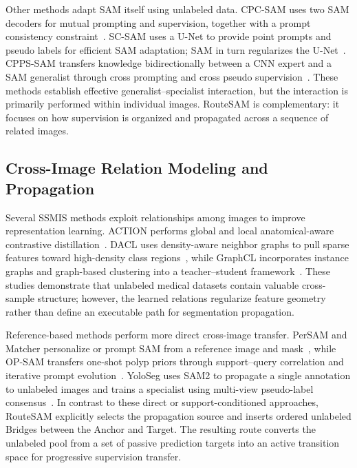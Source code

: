\documentclass[a4paper,fleqn]{cas-dc}
\begin{document}
Other methods adapt SAM itself using unlabeled data. CPC-SAM uses two SAM decoders for mutual prompting and supervision, together with a prompt consistency constraint~\cite{miao2024cpcsam}. SC-SAM uses a U-Net to provide point prompts and pseudo labels for efficient SAM adaptation; SAM in turn regularizes the U-Net~\cite{vu2026scsam}. CPPS-SAM transfers knowledge bidirectionally between a CNN expert and a SAM generalist through cross prompting and cross pseudo supervision~\cite{zhang2026cppssam}. These methods establish effective generalist--specialist interaction, but the interaction is primarily performed within individual images. RouteSAM is complementary: it focuses on how supervision is organized and propagated across a sequence of related images.

\subsection{Cross-Image Relation Modeling and Propagation}

Several SSMIS methods exploit relationships among images to improve representation learning. ACTION performs global and local anatomical-aware contrastive distillation~\cite{you2022action}. DACL uses density-aware neighbor graphs to pull sparse features toward high-density class regions~\cite{tang2024dacl}, while GraphCL incorporates instance graphs and graph-based clustering into a teacher--student framework~\cite{wang2024graphcl}. These studies demonstrate that unlabeled medical datasets contain valuable cross-sample structure; however, the learned relations regularize feature geometry rather than define an executable path for segmentation propagation.

Reference-based methods perform more direct cross-image transfer. PerSAM and Matcher personalize or prompt SAM from a reference image and mask~\cite{zhang2023persam,liu2023matcher}, while OP-SAM transfers one-shot polyp priors through support--query correlation and iterative prompt evolution~\cite{mao2025opsam}. YoloSeg uses SAM2 to propagate a single annotation to unlabeled images and trains a specialist using multi-view pseudo-label consensus~\cite{zhang2026yoloseg}. In contrast to these direct or support-conditioned approaches, RouteSAM explicitly selects the propagation source and inserts ordered unlabeled Bridges between the Anchor and Target. The resulting route converts the unlabeled pool from a set of passive prediction targets into an active transition space for progressive supervision transfer.
\end{document}
